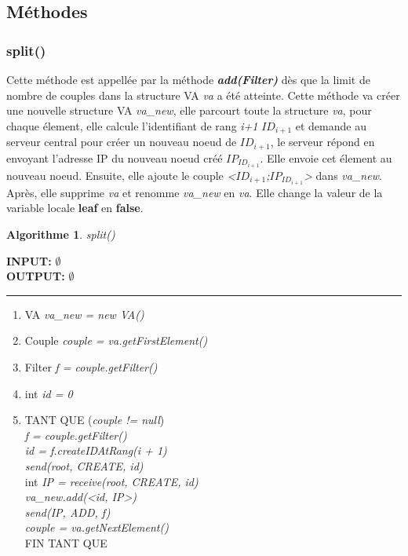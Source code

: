 \documentclass[a4paper,11pt]{report}
\begin{document}
\subsection{Méthodes}
\subsubsection{split()}
	Cette méthode est appellée par la méthode \textbf{\textit{add(Filter)}} dès que la limit de nombre de couples dans la structure VA \textit{va} a été atteinte. Cette méthode va créer une nouvelle structure VA \textit{va\_new}, elle parcourt toute la structure \textit{va}, pour chaque élement, elle calcule l'identifiant de rang \textit{i+1} $ID_{i+1}$ et demande au serveur central pour créer un nouveau noeud de $ID_{i+1}$, le serveur répond en envoyant l'adresse IP du nouveau noeud créé $IP_{ID_{i+1}}$. Elle envoie cet élement au nouveau noeud. Ensuite, elle ajoute le couple \textit{<$ID_{i+1}$;$IP_{ID_{i+1}}$>} dans \textit{va\_new}. Après, elle supprime \textit{va} et renomme \textit{va\_new} en \textit{va}. Elle change la valeur de la variable locale \textbf{leaf} en \textbf{false}.

\newtheorem{algorithme}{Algorithme}
\begin{algorithme}
	split()
\end{algorithme}

\begin{flushleft}
	\begin{framed}
		\textbf{INPUT:} $\emptyset$\\
		\textbf{OUTPUT:} $\emptyset$
		\noindent\rule{\linewidth}{0.5pt}

		\begin{enumerate}
			\item VA \textit{va\_new = new VA()}
			\item Couple \textit{couple = va.getFirstElement()}
			\item Filter \textit{f = couple.getFilter()}
			\item int \textit{id = 0}
			\item 
		\begin{tabbing}
			TANT QUE (\= \textit{couple != null})\\
					\> \textit{f = couple.getFilter()}\\
					\> \textit{id = f.createIDAtRang(i + 1)}\\
					\> \textit{send(root, CREATE, id)}\\
					\> int \textit{IP = receive(root, CREATE, id)}\\
					\> \textit{va\_new.add(<id, IP>)}\\
					\> \textit{send(IP, ADD, f)}\\
					\> \textit{couple = va.getNextElement()}\\
			FIN TANT QUE\\
	    \end{tabbing}
		\end{enumerate}
	\end{framed}
\end{flushleft}
\end{document}
